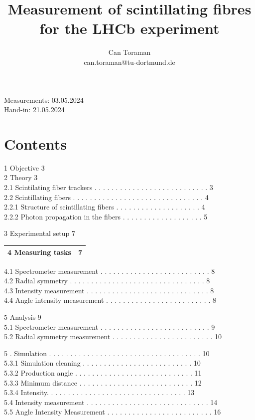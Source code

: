 \documentclass[10pt]{article}
\title{Measurement of scintillating fibres for the LHCb experiment }
\author{Can Toraman\\
can.toraman@tu-dortmund.de}
\date{}
\begin{document}
\maketitle
Measurements: 03.05.2024\\
Hand-in: 21.05.2024

\section*{Contents}
1 Objective 3\\
2 Theory 3\\
2.1 Scintilating fiber trackers . . . . . . . . . . . . . . . . . . . . . . . . . . . 3\\
2.2 Scintillating fibers . . . . . . . . . . . . . . . . . . . . . . . . . . . . . . . 4\\
2.2.1 Structure of scintillating fibers . . . . . . . . . . . . . . . . . . . . 4\\
2.2.2 Photon propagation in the fibers . . . . . . . . . . . . . . . . . . . 5

3 Experimental setup 7

\begin{center}
\begin{tabular}{|ll|}
\hline
4 Measuring tasks & $\mathbf{7}$ \\
\hline
\end{tabular}
\end{center}

4.1 Spectrometer measurement . . . . . . . . . . . . . . . . . . . . . . . . . . 8\\
4.2 Radial symmetry . . . . . . . . . . . . . . . . . . . . . . . . . . . . . . . . 8\\
4.3 Intensity measurement . . . . . . . . . . . . . . . . . . . . . . . . . . . . . 8\\
4.4 Angle intensity measurement . . . . . . . . . . . . . . . . . . . . . . . . . 8

5 Analysis 9\\
5.1 Spectrometer measurement . . . . . . . . . . . . . . . . . . . . . . . . . . 9\\
5.2 Radial symmetry measurement . . . . . . . . . . . . . . . . . . . . . . . . 10

5 . Simulation . . . . . . . . . . . . . . . . . . . . . . . . . . . . . . . . . . . . 10\\
5.3.1 Simulation cleaning . . . . . . . . . . . . . . . . . . . . . . . . . . 10\\
5.3.2 Production angle . . . . . . . . . . . . . . . . . . . . . . . . . . . . 11\\
5.3.3 Minimum distance . . . . . . . . . . . . . . . . . . . . . . . . . . . 12\\
5.3.4 Intensity. . . . . . . . . . . . . . . . . . . . . . . . . . . . . . . . . 13\\
5.4 Intensity measurement . . . . . . . . . . . . . . . . . . . . . . . . . . . . . 14\\
5.5 Angle Intensity Measurement . . . . . . . . . . . . . . . . . . . . . . . . . 16
\end{document}
